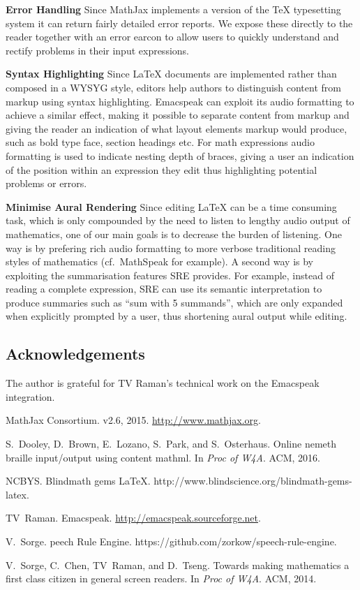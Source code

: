 \documentclass{sig-alternate-05-2015}
\newcommand{\sre}{SRE\xspace}
\begin{document}
\textbf{Error Handling} Since MathJax implements a version of the TeX
typesetting system it can return fairly detailed error reports. We expose these
directly to the reader together with an error earcon to allow users to quickly
understand and rectify problems in their input expressions.

\textbf{Syntax Highlighting} Since {\LaTeX} documents are implemented rather
than composed in a WYSYG style, editors help authors to distinguish content from
markup using syntax highlighting. Emacspeak can exploit its audio formatting to
achieve a similar effect, making it possible to separate content from markup and
giving the reader an indication of what layout elements markup would produce,
such as bold type face, section headings etc. For math expressions audio
formatting is used to indicate nesting depth of braces, giving a user an
indication of the position within an expression they edit thus highlighting
potential problems or errors.


\textbf{Minimise Aural Rendering} Since editing {\LaTeX} can be a time consuming
task, which is only compounded by the need to listen to lengthy audio output of
mathematics, one of our main goals is to decrease the burden of listening. One
way is by prefering rich audio formatting to more verbose traditional reading
styles of mathematics (cf.~MathSpeak for example). A second way is by exploiting
the summarisation features \sre provides. For example, instead of reading a
complete expression, \sre can use its semantic interpretation to produce
summaries such as ``sum with 5 summands'', which are only expanded when
explicitly prompted by a user, thus shortening aural output while editing.

\subsection*{Acknowledgements}

The author is grateful for TV Raman's technical work on the Emacspeak
integration.

\begin{thebibliography}{1}

MathJax Consortium.
 v2.6, 2015.
\newblock \url{http://www.mathjax.org}.

S.~Dooley, D.~Brown, E.~Lozano, S.~Park, and S.~Osterhaus.
\newblock Online nemeth braille input/output using content mathml.
\newblock In {\em Proc of W4A}. ACM, 2016.

NCBYS.
\newblock Blindmath gems {LaTeX}.
\newblock http://www.blindscience.org/blindmath-gems-latex.

TV~Raman.
\newblock Emacspeak.
\newblock \url{http://emacspeak.sourceforge.net}.

V.~Sorge.
peech {R}ule {E}ngine.
\newblock https://github.com/zorkow/speech-rule-engine.

V.~Sorge, C.~Chen, TV~Raman, and D.~Tseng.
\newblock Towards making mathematics a first class citizen in general screen
  readers.
\newblock In {\em Proc of W4A}. ACM, 2014.

\end{thebibliography}
\end{document}
